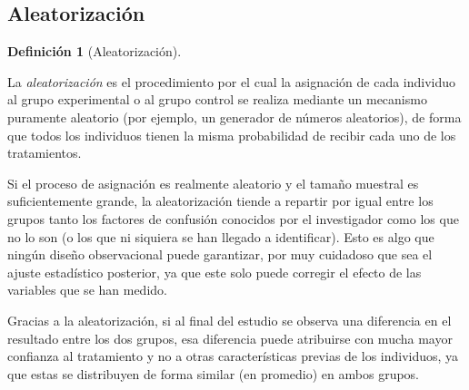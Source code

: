 \documentclass[
  spanish,
  a4paper,
]{scrreport}
\theoremstyle{definition}
\theoremstyle{definition}
\newtheorem{definition}{Definición}[chapter]
\theoremstyle{remark}
\begin{document}
\subsection{Aleatorización}\label{aleatorizaciuxf3n}

\begin{definition}[Aleatorización]\protect\hypertarget{def-experimentales-aleatorizacion}{}\label{def-experimentales-aleatorizacion}

La \emph{aleatorización} es el procedimiento por el cual la asignación
de cada individuo al grupo experimental o al grupo control se realiza
mediante un mecanismo puramente aleatorio (por ejemplo, un generador de
números aleatorios), de forma que todos los individuos tienen la misma
probabilidad de recibir cada uno de los tratamientos.

\end{definition}

\begin{tcolorbox}[enhanced jigsaw, arc=.35mm, bottomrule=.15mm, bottomtitle=1mm, breakable, colback=white, colbacktitle=quarto-callout-important-color!10!white, colframe=quarto-callout-important-color-frame, coltitle=black, left=2mm, leftrule=.75mm, opacityback=0, opacitybacktitle=0.6, rightrule=.15mm, title=\textcolor{quarto-callout-important-color}{\faExclamation}\hspace{0.5em}{Importante}, titlerule=0mm, toprule=.15mm, toptitle=1mm]

Si el proceso de asignación es realmente aleatorio y el tamaño muestral
es suficientemente grande, la aleatorización tiende a repartir por igual
entre los grupos tanto los factores de confusión conocidos por el
investigador como los que no lo son (o los que ni siquiera se han
llegado a identificar). Esto es algo que ningún diseño observacional
puede garantizar, por muy cuidadoso que sea el ajuste estadístico
posterior, ya que este solo puede corregir el efecto de las variables
que se han medido.

\end{tcolorbox}

\begin{tcolorbox}[enhanced jigsaw, arc=.35mm, bottomrule=.15mm, bottomtitle=1mm, breakable, colback=white, colbacktitle=quarto-callout-note-color!10!white, colframe=quarto-callout-note-color-frame, coltitle=black, left=2mm, leftrule=.75mm, opacityback=0, opacitybacktitle=0.6, rightrule=.15mm, title=\textcolor{quarto-callout-note-color}{\faInfo}\hspace{0.5em}{Interpretación}, titlerule=0mm, toprule=.15mm, toptitle=1mm]

Gracias a la aleatorización, si al final del estudio se observa una
diferencia en el resultado entre los dos grupos, esa diferencia puede
atribuirse con mucha mayor confianza al tratamiento y no a otras
características previas de los individuos, ya que estas se distribuyen
de forma similar (en promedio) en ambos grupos.

\end{tcolorbox}
\end{document}

